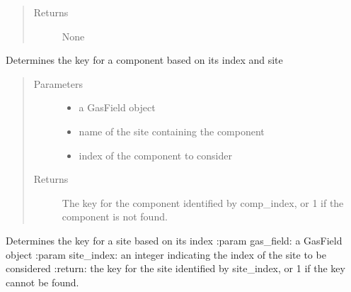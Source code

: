\documentclass[letterpaper,10pt,english]{sphinxmanual}
\begin{document}
\begin{fulllineitems}
\begin{fulllineitems}
\begin{quote}
\begin{description}
\item[{Returns}] \leavevmode
None

\end{description}\end{quote}

\end{fulllineitems}


\begin{fulllineitems}
\label{\detokenize{index:feast.DetectionModules.abstract_detection_method.DetectionMethod.find_comp_name}}
Determines the key for a component based on its index and site
\begin{quote}\begin{description}
\item[{Parameters}] \leavevmode\begin{itemize}
\item {} 
 \textendash{} a GasField object

\item {} 
 \textendash{} name of the site containing the component

\item {} 
 \textendash{} index of the component to consider

\end{itemize}

\item[{Returns}] \leavevmode
The key for the component identified by comp\_index, or \sphinxhyphen{}1 if the component is not found.

\end{description}\end{quote}

\end{fulllineitems}


\begin{fulllineitems}
\label{\detokenize{index:feast.DetectionModules.abstract_detection_method.DetectionMethod.find_site_name}}
Determines the key for a site based on its index
:param gas\_field: a GasField object
:param site\_index: an integer indicating the index of the site to be considered
:return: the key for the site identified by site\_index, or \sphinxhyphen{}1 if the key cannot be found.


\end{fulllineitems}
\end{fulllineitems}
\end{document}
